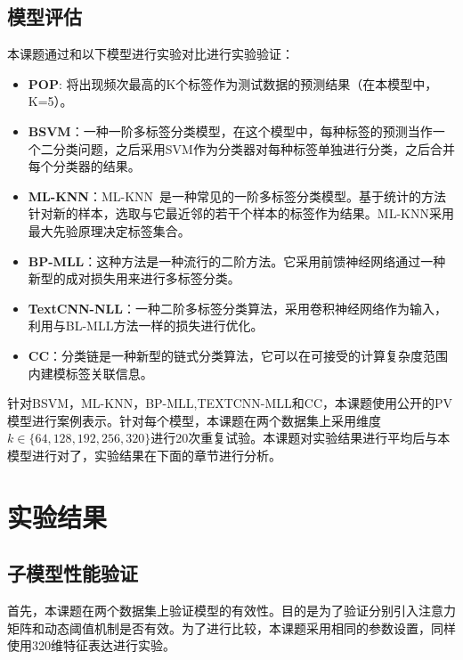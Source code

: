 \subsection{模型评估}
本课题通过和以下模型进行实验对比进行实验验证：
\begin{itemize}
    \item \textbf{POP}: 将出现频次最高的K个标签作为测试数据的预测结果（在本模型中，K=5）。
    \item \textbf{BSVM}：一种一阶多标签分类模型\cite{Elisseeff2001A}，在这个模型中，每种标签的预测当作一个二分类问题，之后采用SVM作为分类器对每种标签单独进行分类，之后合并每个分类器的结果。
    \item \textbf{ML-KNN}：ML-KNN~\cite{zhang2007ml}是一种常见的一阶多标签分类模型。基于统计的方法针对新的样本，选取与它最近邻的若干个样本的标签作为结果。ML-KNN采用最大先验原理决定标签集合。
    \item \textbf{BP-MLL}：这种方法\cite{zhang2006multilabel}是一种流行的二阶方法。它采用前馈神经网络通过一种新型的成对损失用来进行多标签分类。
    \item \textbf{TextCNN-NLL}：一种二阶多标签分类算法，采用卷积神经网络\cite{Kim14}作为输入，利用与BL-MLL方法一样的损失进行优化。
    \item \textbf{CC}：分类链\cite{ReadPHF11}是一种新型的链式分类算法，它可以在可接受的计算复杂度范围内建模标签关联信息。
\end{itemize}

针对BSVM，ML-KNN，BP-MLL,TEXTCNN-MLL和CC，本课题使用公开的PV模型\cite{le2014distributed}进行案例表示。针对每个模型，本课题在两个数据集上采用维度$k\in \{64,128,192,256,320\}$进行20次重复试验。本课题对实验结果进行平均后与本模型进行对了，实验结果在下面的章节进行分析。

\section{实验结果}
\label{sec:dpam_exper_result}
\subsection{子模型性能验证}
首先，本课题在两个数据集上验证模型的有效性。目的是为了验证分别引入注意力矩阵和动态阈值机制是否有效。为了进行比较，本课题采用相同的参数设置，同样使用320维特征表达进行实验。

